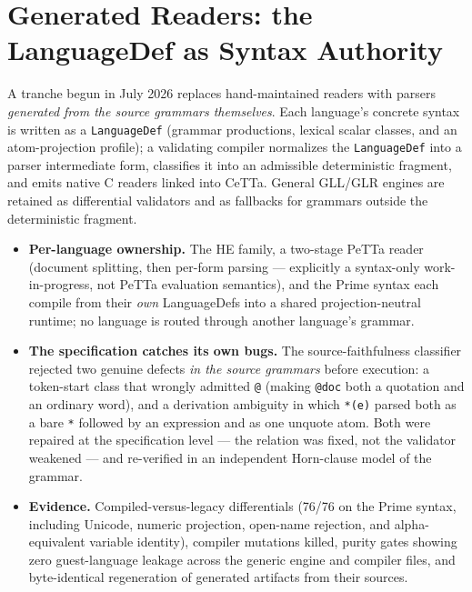 \documentclass[11pt]{article}
\newcommand{\code}[1]{\texttt{#1}}
\newcommand{\PeTTa}{\textup{PeTTa}}
\newcommand{\HE}{\textup{HE}}
\newcommand{\CeTTa}{\textup{CeTTa}}
\begin{document}
\section{Generated Readers: the LanguageDef as Syntax Authority}
\label{sec:gslt2parse}

A tranche begun in July 2026 replaces
hand-maintained readers with parsers \emph{generated from the source
grammars themselves}.  Each language's concrete syntax is written as a
\code{LanguageDef} (grammar productions, lexical scalar classes, and
an atom-projection profile); a validating compiler normalizes the
\code{LanguageDef} into a parser intermediate form, classifies it into an
admissible deterministic fragment, and emits native C readers linked into
\CeTTa{}.  General GLL/GLR engines are retained as differential validators
and as fallbacks for grammars outside the deterministic fragment.

\begin{itemize}
\item \textbf{Per-language ownership.}  The \HE{} family, a two-stage
  \PeTTa{} reader (document splitting, then per-form parsing --- explicitly
  a syntax-only work-in-progress, not \PeTTa{} evaluation semantics), and
  the Prime syntax each compile from their \emph{own} LanguageDefs into a
  shared projection-neutral runtime; no language is routed through another
  language's grammar.
\item \textbf{The specification catches its own bugs.}  The
  source-faithfulness classifier rejected two genuine defects \emph{in the
  source grammars} before execution: a token-start class that wrongly
  admitted \code{@} (making \code{@doc} both a quotation and an ordinary
  word), and a derivation ambiguity in which \code{*(e)} parsed both as a
  bare \code{*} followed by an expression and as one unquote atom.  Both
  were repaired at the specification level --- the relation was fixed, not
  the validator weakened --- and re-verified in an independent Horn-clause
  model of the grammar.
\item \textbf{Evidence.}  Compiled-versus-legacy differentials (76/76 on
  the Prime syntax, including Unicode, numeric projection, open-name
  rejection, and alpha-equivalent variable identity), compiler mutations
  killed, purity gates showing zero guest-language leakage across the
  generic engine and compiler files, and byte-identical regeneration of
  generated artifacts from their sources.
\end{itemize}
\end{document}
